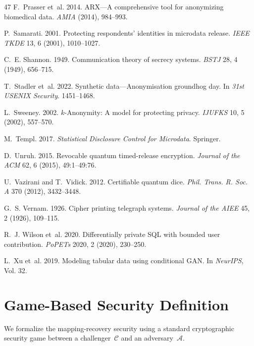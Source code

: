 \documentclass[acmsmall,screen,review,anonymous]{acmart}
\begin{document}
\begin{thebibliography}{47}
F.~Prasser et~al. 2014. ARX---A comprehensive tool for anonymizing biomedical data. \emph{AMIA} (2014), 984--993.

P.~Samarati. 2001. Protecting respondents' identities in microdata release. \emph{IEEE TKDE} 13, 6 (2001), 1010--1027.

C.~E. Shannon. 1949. Communication theory of secrecy systems. \emph{BSTJ} 28, 4 (1949), 656--715.

T.~Stadler et~al. 2022. Synthetic data---Anonymisation groundhog day. In \emph{31st USENIX Security}. 1451--1468.

L.~Sweeney. 2002. $k$-Anonymity: A model for protecting privacy. \emph{IJUFKS} 10, 5 (2002), 557--570.

M.~Templ. 2017. \emph{Statistical Disclosure Control for Microdata}. Springer.

D.~Unruh. 2015. Revocable quantum timed-release encryption. \emph{Journal of the ACM} 62, 6 (2015), 49:1--49:76.

U.~Vazirani and T.~Vidick. 2012. Certifiable quantum dice. \emph{Phil. Trans. R. Soc. A} 370 (2012), 3432--3448.

G.~S. Vernam. 1926. Cipher printing telegraph systems. \emph{Journal of the AIEE} 45, 2 (1926), 109--115.

R.~J. Wilson et~al. 2020. Differentially private SQL with bounded user contribution. \emph{PoPETs} 2020, 2 (2020), 230--250.

L.~Xu et~al. 2019. Modeling tabular data using conditional GAN. In \emph{NeurIPS}, Vol. 32.

\end{thebibliography}

\appendix
\section{Game-Based Security Definition}
\label{app:security-game}

We formalize the mapping-recovery security using a standard cryptographic security game between a challenger~$\mathcal{C}$ and an adversary~$\mathcal{A}$.
\end{document}
